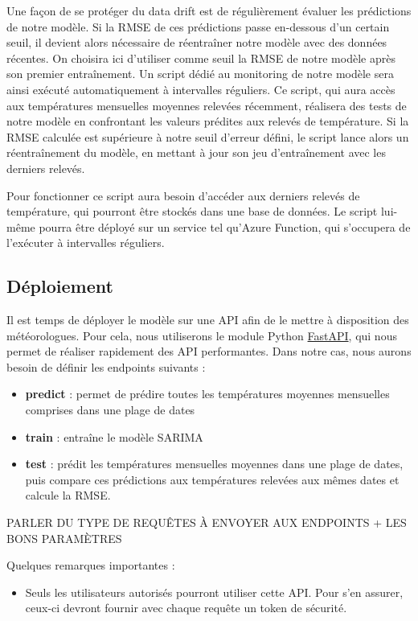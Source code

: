 \documentclass[french]{article}
\begin{document}
    Une façon de se protéger du data drift est de régulièrement évaluer les prédictions de notre modèle. Si la RMSE de ces prédictions passe en-dessous d'un certain seuil, il devient alors nécessaire de réentraîner notre modèle avec des données récentes. On choisira ici d'utiliser comme seuil la RMSE de notre modèle après son premier entraînement. Un script dédié au monitoring de notre modèle sera ainsi exécuté automatiquement à intervalles réguliers. Ce script, qui aura accès aux températures mensuelles moyennes relevées récemment, réalisera des tests de notre modèle en confrontant les valeurs prédites aux relevés de température. Si la RMSE calculée est supérieure à notre seuil d'erreur défini, le script lance alors un réentraînement du modèle, en mettant à jour son jeu d'entraînement avec les derniers relevés.
    
    Pour fonctionner ce script aura besoin d'accéder aux derniers relevés de température, qui pourront être stockés dans une base de données. Le script lui-même pourra être déployé sur un service tel qu'Azure Function, qui s'occupera de l'exécuter à intervalles réguliers.


    \subsection{Déploiement}

    Il est temps de déployer le modèle sur une API afin de le mettre à disposition des météorologues. Pour cela, nous utiliserons le module Python \href{https://fastapi.tiangolo.com/}{FastAPI}, qui nous permet de réaliser rapidement des API performantes.
    Dans notre cas, nous aurons besoin de définir les endpoints suivants :
    \begin{itemize}
        \item \textbf{predict} : permet de prédire toutes les températures moyennes mensuelles comprises dans une plage de dates
        \item \textbf{train} : entraîne le modèle SARIMA
        \item \textbf{test} : prédit les températures mensuelles moyennes dans une plage de dates, puis compare ces prédictions aux températures relevées aux mêmes dates et calcule la RMSE.
    \end{itemize}

    PARLER DU TYPE DE REQUÊTES À ENVOYER AUX ENDPOINTS + LES BONS PARAMÈTRES

    Quelques remarques importantes :
    \begin{itemize}
        \item Seuls les utilisateurs autorisés pourront utiliser cette API. Pour s'en assurer, ceux-ci devront fournir avec chaque requête un token de sécurité.
    \end{itemize}
\end{document}
